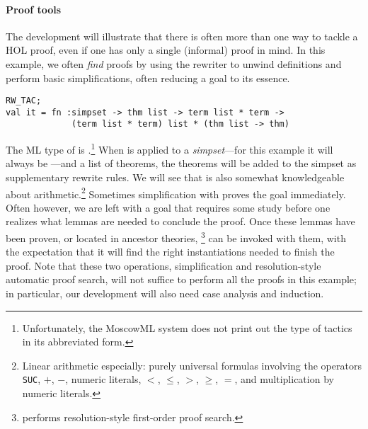 \paragraph{Proof tools}
The development will illustrate that there is often more than one way to
tackle a HOL proof, even if one has only a single (informal) proof in
mind. In this example, we often \emph{find} proofs by using
the rewriter  to unwind definitions and perform basic
simplifications, often reducing a goal to its essence.
\begin{session}
\begin{verbatim}
RW_TAC;
val it = fn :simpset -> thm list -> term list * term ->
             (term list * term) list * (thm list -> thm)
\end{verbatim}
\end{session}
The ML type of  is
.\footnote{Unfortunately, the MoscowML system does not print out
the type of tactics in its abbreviated form.}
When  is applied to a \textit{simpset}---for this example it will
always be ---and a list of theorems, the
theorems will be added to the simpset as supplementary rewrite rules.
We will see that  is also somewhat knowledgeable about
arithmetic.\footnote{Linear arithmetic especially: purely universal
formulas involving the operators {\tt SUC}, $+$, $-$, numeric
literals, $<$, $\leq$, $>$, $\geq$, $=$, and multiplication by numeric
literals.}
Sometimes simplification with  proves the goal immediately.
Often however, we are left with a goal that requires some study before one
realizes what lemmas are needed to conclude the proof. Once these lemmas
have been proven, or located in ancestor theories,
\footnote{
performs resolution-style first-order proof search.} can
be invoked with them, with the expectation that it will find the right
instantiations needed to finish the proof. Note that these two operations,
simplification and resolution-style automatic proof search, will not suffice to
perform all the proofs in this example; in particular, our development will
also need case analysis and induction.

